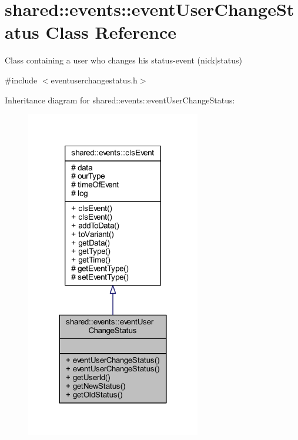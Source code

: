 \hypertarget{classshared_1_1events_1_1event_user_change_status}{\section{shared\-:\-:events\-:\-:event\-User\-Change\-Status Class Reference}
\label{d3/dcc/classshared_1_1events_1_1event_user_change_status}
}


Class containing a user who changes his status-\/event (nick$|$status)  




{\ttfamily \#include $<$eventuserchangestatus.\-h$>$}



Inheritance diagram for shared\-:\-:events\-:\-:event\-User\-Change\-Status\-:\nopagebreak
\begin{figure}[H]
\begin{center}
\leavevmode
\includegraphics[width=216pt]{da/d66/classshared_1_1events_1_1event_user_change_status__inherit__graph}
\end{center}
\end{figure}


